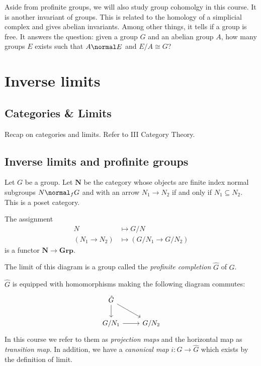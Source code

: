 \documentclass[a4paper]{article}
\renewcommand{\c}[1]{\mathbf{#1}} %
\begin{document}
Aside from profinite groups, we will also study group cohomolgy in this course. It is another invariant of groups. This is related to the homology of a simplicial complex and gives abelian invariants. Among other things, it tells if a group is free. It answers the question: given a group \(G\) and an abelian group \(A\), how many groups \(E\) exists such that \(A \normal E\) and \(E/A \cong G\)?

\section{Inverse limits}

\subsection{Categories \& Limits}

Recap on categories and limits. Refer to III Category Theory.

\subsection{Inverse limits and profinite groups}

\begin{definition}
  Let \(G\) be a group. Let \(\c N\) be the category whose objects are finite index normal subgroups \(N \normal_f G\) and with an arrow \(N_1 \to N_2\) if and only if \(N_1 \subseteq N_2\). This is a poset category.

  The assignment
  \begin{align*}
    N &\mapsto G/N \\
    (N_1 \to N_2) &\mapsto (G/N_1 \to G/N_2)
  \end{align*}
  is a functor \(\c N \to \c{Grp}\).

  The limit of this diagram is a group called the \emph{profinite completion} \(\hat G\) of \(G\).
\end{definition}

\begin{notation}
  \(\hat G\) is equipped with homomorphisms making the following diagram commutes:
  \[
    \begin{tikzcd}
      \hat G \ar[d] \ar[dr] \\
      G/N_1 \ar[r] & G/N_2
    \end{tikzcd}
  \]
  In this course we refer to them as \emph{projection maps} and the horizontal map as \emph{transition map}. In addition, we have a \emph{canonical map} \(i: G \to \hat G\) which exists by the definition of limit.
\end{notation}
\end{document}
